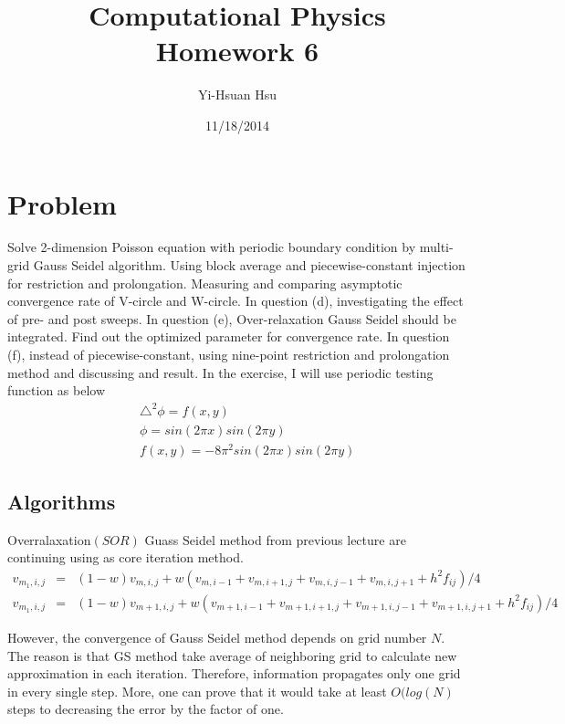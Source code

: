 \documentclass[12pt]{article}
\begin{document}
\title{Computational Physics \\ Homework 6}
\author{Yi-Hsuan Hsu}
\date{11/18/2014}
\maketitle

\section{Problem}
Solve 2-dimension Poisson equation with periodic boundary condition by multi-grid Gauss Seidel algorithm. Using block average and piecewise-constant injection for restriction and prolongation. Measuring and comparing asymptotic convergence rate of V-circle and W-circle. In question (d), investigating the effect of pre- and post sweeps. In question (e), Over-relaxation Gauss Seidel should be integrated. Find out the optimized parameter for convergence rate. In question (f), instead of piecewise-constant, using nine-point restriction and prolongation method and discussing and result. In the exercise, I will use periodic testing function as below
\begin{eqnarray}
		&&\triangle^2 \phi=f(x,y)\nonumber\\
		&&\phi=sin(2\pi x)sin(2\pi y)\nonumber\\
		&& f(x,y)=-8\pi^2sin(2\pi x)sin(2 \pi y)
\end{eqnarray}

\subsection{Algorithms}

Overralaxation$(SOR)$ Guass Seidel method from previous lecture are continuing using as core iteration method.
\begin{eqnarray}
v_{m_1,i,j}&=&(1-w)v_{m,i,j}+ w(v_{m,i-1}+v_{m,i+1,j}+v_{m,i,j-1}+v_{m,i,j+1}+h^2f_{ij})/4\\
v_{m_1,i,j}&=&(1-w)v_{m+1,i,j}+w(v_{m+1,i-1}+v_{m+1,i+1,j}+v_{m+1,i,j-1}+v_{m+1,i,j+1}+h^2f_{ij})/4
\end{eqnarray}

However, the convergence of Gauss Seidel method depends on grid number $N$. The reason is that GS method take average of neighboring grid to calculate new approximation in each iteration. Therefore, information propagates only one grid in every single step. More, one can prove that it would take at least $O(log(N)$ steps to decreasing the error by the factor of one.
\end{document}
